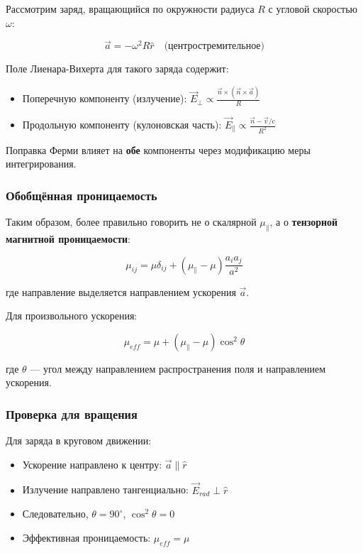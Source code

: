 \documentclass[12pt, a4paper]{article}
\begin{document}
Рассмотрим заряд, вращающийся по окружности радиуса $R$ с угловой скоростью $\omega$:

\begin{equation}
\vec{a} = -\omega^2 R \hat{r} \quad \text{(центростремительное)}
\label{eq:centripetal}
\end{equation}

Поле Лиенара-Вихерта для такого заряда содержит:
\begin{itemize}
    \item Поперечную компоненту (излучение): $\vec{E}_{\perp} \propto \frac{\vec{n} \times (\vec{n} \times \vec{a})}{R}$
    \item Продольную компоненту (кулоновская часть): $\vec{E}_{\parallel} \propto \frac{\vec{n} - \vec{v}/c}{R^2}$
\end{itemize}

Поправка Ферми влияет на \textbf{обе} компоненты через модификацию меры интегрирования.

\subsubsection{Обобщённая проницаемость}

Таким образом, более правильно говорить не о скалярной $\mu_{\parallel}$, а о \textbf{тензорной магнитной проницаемости}:

\begin{equation}
\mu_{ij} = \mu \delta_{ij} + (\mu_{\parallel} - \mu) \frac{a_i a_j}{a^2}
\label{eq:mu_tensor}
\end{equation}

где направление выделяется направлением ускорения $\vec{a}$.

Для произвольного ускорения:

\begin{equation}
\mu_{eff} = \mu + (\mu_{\parallel} - \mu) \cos^2\theta
\label{eq:mu_effective}
\end{equation}

где $\theta$ — угол между направлением распространения поля и направлением ускорения.

\subsubsection{Проверка для вращения}

Для заряда в круговом движении:
\begin{itemize}
    \item Ускорение направлено к центру: $\vec{a} \parallel \hat{r}$
    \item Излучение направлено тангенциально: $\vec{E}_{rad} \perp \hat{r}$
    \item Следовательно, $\theta = 90^\circ$, $\cos^2\theta = 0$
    \item Эффективная проницаемость: $\mu_{eff} = \mu$
\end{itemize}
\end{document}
